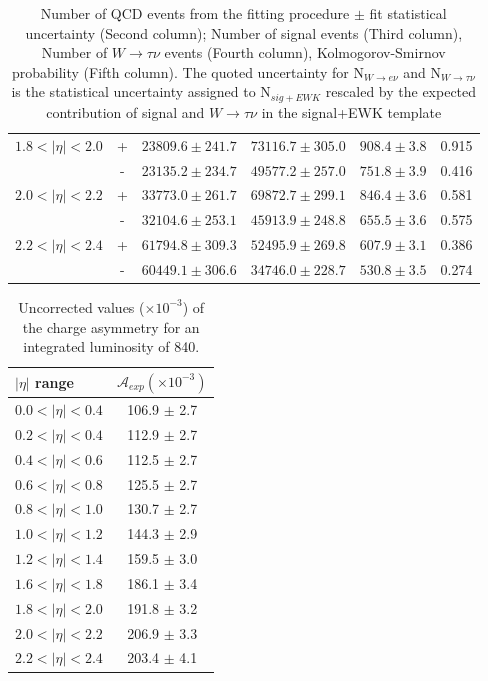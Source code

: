 \begin{table}[htb]
\begin{center}
\begin{tabular}{lcrrrr}
$1.8<| \eta |<2.0$ &  +& $23809.6 \pm 241.7$ &$73116.7\pm305.0$&$ 908.4\pm3.8 $&0.915 \\
                   &  -& $23135.2 \pm 234.7$ &$49577.2\pm257.0$&$ 751.8\pm3.9 $&0.416 \\ 
$2.0<| \eta |<2.2$ &  +& $33773.0 \pm 261.7$ &$69872.7\pm299.1$&$ 846.4\pm3.6 $&0.581 \\
                   &  -& $32104.6 \pm 253.1$ &$45913.9\pm248.8$&$ 655.5\pm3.6 $&0.575 \\ 
$2.2<| \eta |<2.4$ &  +& $61794.8 \pm 309.3$ &$52495.9\pm269.8$&$ 607.9\pm3.1 $&0.386 \\
                   &  -& $60449.1 \pm 306.6$ &$34746.0\pm228.7$&$ 530.8\pm3.5 $&0.274 \\ 
 \end{tabular}
 \caption{\label{tab:chi2}
 Number of QCD events from the fitting procedure $\pm$ fit statistical uncertainty (Second column);
   Number of signal events  (Third column), Number of $W\rightarrow \tau \nu$ events (Fourth column),
 Kolmogorov-Smirnov probability (Fifth column).
 The quoted uncertainty for N$_{W\rightarrow e \nu}$ and N$_{W\rightarrow \tau \nu}$
 is the statistical uncertainty assigned to N$_{sig+EWK}$
 rescaled by the expected contribution of signal and $W\rightarrow \tau \nu$ in the signal+EWK template}
 \end{center}
\end{table}

\begin{table}[htb]
  \begin{center}
    \begin{tabular}{lc}
    $|\eta|$ range & $\mathcal{A}_{exp} (\times 10^{-3})$\\
    \hline
    $0.0<|\eta|<0.4$ & 106.9 $\pm$ 2.7\\
    $0.2<|\eta|<0.4$ & 112.9 $\pm$ 2.7\\
    $0.4<|\eta|<0.6$ & 112.5 $\pm$ 2.7\\
    $0.6<|\eta|<0.8$ & 125.5 $\pm$ 2.7\\
    $0.8<|\eta|<1.0$ & 130.7 $\pm$ 2.7\\
    $1.0<|\eta|<1.2$ & 144.3 $\pm$ 2.9\\
    $1.2<|\eta|<1.4$ & 159.5 $\pm$ 3.0 \\
    $1.6<|\eta|<1.8$ & 186.1 $\pm$ 3.4\\
    $1.8<|\eta|<2.0$ & 191.8 $\pm$ 3.2\\
    $2.0<|\eta|<2.2$ & 206.9 $\pm$ 3.3\\
    $2.2<|\eta|<2.4$ & 203.4 $\pm$ 4.1\\
    \end{tabular}
  \caption{\label{tab:uncorRes}Uncorrected values ($\times 10^{-3}$) of the
  charge asymmetry  for an integrated luminosity of \unit{840}{\invpb}. }
  \end{center}
\end{table}

